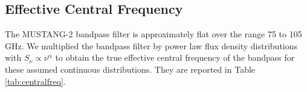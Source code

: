 \documentclass[twocolumn]{aastex62}
\def\todo#1{{\textcolor{red}{TODO: #1}}}
\newcommand{\MUSTANG}{MUSTANG-2\xspace}
\begin{document}


%


\subsection{Effective Central Frequency}
The \MUSTANG bandpass filter is approximately flat over the range 75 to 105 GHz.
We multiplied the bandpass filter by power law flux density distributions with $S_\nu\propto\nu^{\alpha}$
to obtain the true effective central frequency of the bandpass for these assumed
continuous distributions.  They are reported in Table \ref{tab:centralfreq}.
\end{document}
